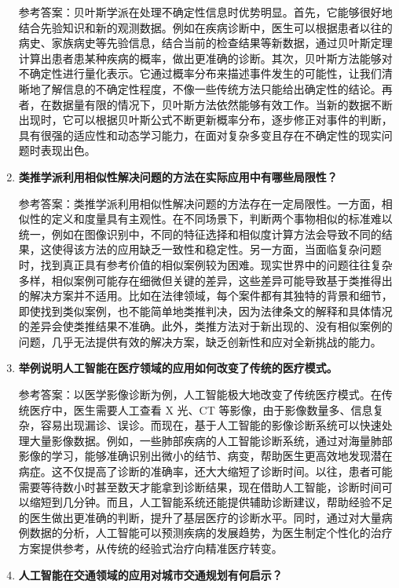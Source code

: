 \begin{enumerate}
参考答案：贝叶斯学派在处理不确定性信息时优势明显。首先，它能够很好地结合先验知识和新的观测数据。例如在疾病诊断中，医生可以根据患者以往的病史、家族病史等先验信息，结合当前的检查结果等新数据，通过贝叶斯定理计算出患者患某种疾病的概率，做出更准确的诊断。其次，贝叶斯方法能够对不确定性进行量化表示。它通过概率分布来描述事件发生的可能性，让我们清晰地了解信息的不确定性程度，不像一些传统方法只能给出确定性的结论。再者，在数据量有限的情况下，贝叶斯方法依然能够有效工作。当新的数据不断出现时，它可以根据贝叶斯公式不断更新概率分布，逐步修正对事件的判断，具有很强的适应性和动态学习能力，在面对复杂多变且存在不确定性的现实问题时表现出色。

\item \textbf{类推学派利用相似性解决问题的方法在实际应用中有哪些局限性？}

参考答案：类推学派利用相似性解决问题的方法存在一定局限性。一方面，相似性的定义和度量具有主观性。在不同场景下，判断两个事物相似的标准难以统一，例如在图像识别中，不同的特征选择和相似度计算方法会导致不同的结果，这使得该方法的应用缺乏一致性和稳定性。另一方面，当面临复杂问题时，找到真正具有参考价值的相似案例较为困难。现实世界中的问题往往复杂多样，相似案例可能存在细微但关键的差异，这些差异可能导致基于类推得出的解决方案并不适用。比如在法律领域，每个案件都有其独特的背景和细节，即使找到类似案例，也不能简单地类推判决，因为法律条文的解释和具体情况的差异会使类推结果不准确。此外，类推方法对于新出现的、没有相似案例的问题，几乎无法提供有效的解决方案，缺乏创新性和应对全新挑战的能力。

\item \textbf{举例说明人工智能在医疗领域的应用如何改变了传统的医疗模式。}

参考答案：以医学影像诊断为例，人工智能极大地改变了传统医疗模式。在传统医疗中，医生需要人工查看 X 光、CT 等影像，由于影像数量多、信息复杂，容易出现漏诊、误诊。而现在，基于人工智能的影像诊断系统可以快速处理大量影像数据。例如，一些肺部疾病的人工智能诊断系统，通过对海量肺部影像的学习，能够准确识别出微小的结节、病变，帮助医生更高效地发现潜在病症。这不仅提高了诊断的准确率，还大大缩短了诊断时间。以往，患者可能需要等待数小时甚至数天才能拿到诊断结果，现在借助人工智能，诊断时间可以缩短到几分钟。而且，人工智能系统还能提供辅助诊断建议，帮助经验不足的医生做出更准确的判断，提升了基层医疗的诊断水平。同时，通过对大量病例数据的分析，人工智能可以预测疾病的发展趋势，为医生制定个性化的治疗方案提供参考，从传统的经验式治疗向精准医疗转变。

\item \textbf{人工智能在交通领域的应用对城市交通规划有何启示？}


\end{enumerate}
